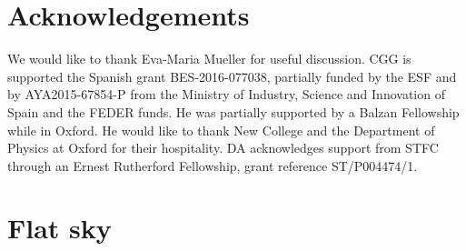 \documentclass[useAMS,usenatbib]{mn2e}
\begin{document}
\section*{Acknowledgements}
We would like to thank Eva-Maria Mueller for useful discussion. CGG is
supported the Spanish grant BES-2016-077038, partially funded by the ESF and by
AYA2015-67854-P from the Ministry of Industry, Science and Innovation of Spain
and the FEDER funds. He was partially supported by a Balzan Fellowship while
in Oxford. He would like to thank New College and the Department of Physics at
Oxford for their hospitality. DA acknowledges support from STFC through an
Ernest Rutherford Fellowship, grant reference ST/P004474/1.

\appendix

\section{Flat sky}

\setlength{\bibhang}{2.0em}
\setlength{}

\end{document}
